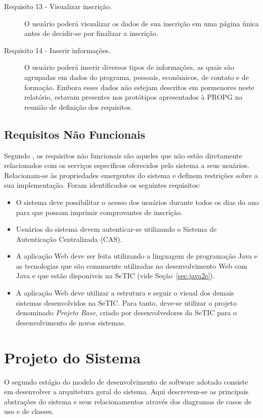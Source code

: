 \documentclass[
  10.5pt,				  %
	openright,			%
	twoside,			  %
  a5paper,
  chapter=TITLE,	%
	section=TITLE,	%
  hyphens,        %
	english,        %
	brazil          %
]{abntex2}
\begin{document}
\begin{description}
\item[Requisito 13 - Visualizar inscrição.] O usuário poderá visualizar os dados de sua inscrição em uma página única antes de decidir-se por finalizar a inscrição.
\item[Requisito 14 - Inserir informações.] O usuário poderá inserir diversos tipos de informações, as quais são agrupadas em dados do programa, pessoais, econômicos, de contato e de formação. Embora esses dados não estejam descritos em pormenores neste relatório, estavam presentes nos protótipos apresentados à PROPG na reunião de definição dos requisitos.
\end{description}


\subsection{Requisitos Não Funcionais}

Segundo , os requisitos não funcionais são aqueles que não estão diretamente relacionados com os serviços específicos oferecidos pelo sistema a seus usuários. Relacionam-se às propriedades emergentes do sistema e definem restrições sobre a sua implementação. Foram identificados os seguintes requisitos:

\begin{itemize}
\item O sistema deve possibilitar o acesso dos usuários durante todos os dias do ano para que possam imprimir comprovantes de inscrição.
\item Usuários do sistema devem autenticar-se utilizando o Sistema de Autenticação Centralizada (CAS).
\item A aplicação Web deve ser feita utilizando a linguagem de programação Java e as tecnologias que são comumente utilizadas no desenvolvimento Web com Java e que estão disponíveis na SeTIC (vide Seção~\ref{sec:java2e}).
\item A aplicação Web deve utilizar a estrutura e seguir o visual dos demais sistemas desenvolvidos na SeTIC. Para tanto, deve-se utilizar o projeto denominado \emph{Projeto Base}, criado por desenvolvedores da SeTIC para o desenvolvimento de novos sistemas.
\end{itemize}

\section{Projeto do Sistema}

O segundo estágio do modelo de desenvolvimento de software adotado consiste em desenvolver a arquitetura geral do sistema. Aqui descrevem-se as principais abstrações do sistema e seus relacionamentos através dos diagramas de casos de uso e de classes.
\end{document}

